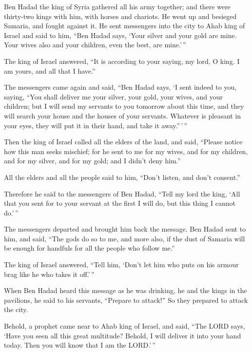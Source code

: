 Ben Hadad the king of Syria gathered all his army
together; and there were thirty-two kings with him, with horses and
chariots. He went up and besieged Samaria, and fought against it.
 He sent messengers into the city to Ahab king of Israel
and said to him, ``Ben Hadad says,  `Your silver and your
gold are mine. Your wives also and your children, even the best, are
mine.'\,''

 The king of Israel answered, ``It is according to your
saying, my lord, O king. I am yours, and all that I have.''

 The messengers came again and said, ``Ben Hadad says, `I
sent indeed to you, saying, ``You shall deliver me your silver, your
gold, your wives, and your children;  but I will send my
servants to you tomorrow about this time, and they will search your
house and the houses of your servants. Whatever is pleasant in your
eyes, they will put it in their hand, and take it away.''\,'\,''

 Then the king of Israel called all the elders of the
land, and said, ``Please notice how this man seeks mischief; for he sent
to me for my wives, and for my children, and for my silver, and for my
gold; and I didn't deny him.''

 All the elders and all the people said to him, ``Don't
listen, and don't consent.''

 Therefore he said to the messengers of Ben Hadad, ``Tell
my lord the king, `All that you sent for to your servant at the first I
will do, but this thing I cannot do.'\,''

The messengers departed and brought him back the message.
 Ben Hadad sent to him, and said, ``The gods do so to me,
and more also, if the dust of Samaria will be enough for handfuls for
all the people who follow me.''

 The king of Israel answered, ``Tell him, `Don't let him
who puts on his armour brag like he who takes it off.'\,''

 When Ben Hadad heard this message as he was drinking, he
and the kings in the pavilions, he said to his servants, ``Prepare to
attack!'' So they prepared to attack the city.

 Behold, a prophet came near to Ahab king of Israel, and
said, ``The LORD says, `Have you seen all this great multitude? Behold,
I will deliver it into your hand today. Then you will know that I am the
LORD.'\,''

